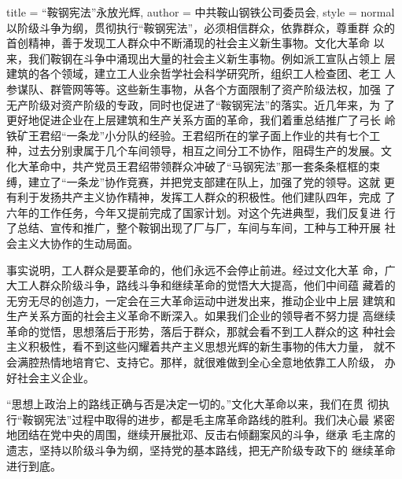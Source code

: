 \begin{hongqiarticle}{
        title  = {“鞍钢宪法”永放光辉},
        author = {中共鞍山钢铁公司委员会},
        style  = normal
    }
    以阶级斗争为纲，贯彻执行“鞍钢宪法”，必须相信群众，依靠群众，尊重群
    众的首创精神，善于发现工人群众中不断涌现的社会主义新生事物。文化大革命
    以来，我们鞍钢在斗争中涌现出大量的社会主义新生事物。例如派工宣队占领上
    层建筑的各个领域，建立工人业余哲学社会科学研究所，组织工人检查团、老工
    人参谋队、群管网等等。这些新生事物，从各个方面限制了资产阶级法权，加强
    了无产阶级对资产阶级的专政，同时也促进了“鞍钢宪法”的落实。近几年来，为
    了更好地促进企业在上层建筑和生产关系方面的革命，我们着重总结推广了弓长
    岭铁矿王君绍“一条龙”小分队的经验。王君绍所在的掌子面上作业的共有七个工
    种，过去分别隶属于几个车间领导，相互之间分工不协作，阻碍生产的发展。文
    化大革命中，共产党员王君绍带领群众冲破了“马钢宪法”那一套条条框框的束
    缚，建立了“一条龙”协作竞赛，并把党支部建在队上，加强了党的领导。这就
    更有利于发扬共产主义协作精神，发挥工人群众的积极性。他们建队四年，完成
    了六年的工作任务，今年又提前完成了国家计划。对这个先进典型，我们反复进
    行了总结、宣传和推广，整个鞍钢出现了厂与厂，车间与车间，工种与工种开展
    社会主义大协作的生动局面。

    事实说明，工人群众是要革命的，他们永远不会停止前进。经过文化大革
    命，广大工人群众阶级斗争，路线斗争和继续革命的觉悟大大提高，他们中间蕴
    藏着的无穷无尽的创造力，一定会在三大革命运动中迸发出来，推动企业中上层
    建筑和生产关系方面的社会主义革命不断深入。如果我们企业的领导者不努力提
    高继续革命的觉悟，思想落后于形势，落后于群众，那就会看不到工人群众的这
    种社会主义积极性，看不到这些闪耀着共产主义思想光辉的新生事物的伟大力量，
    就不会满腔热情地培育它、支持它。那样，就很难做到全心全意地依靠工人阶级，
    办好社会主义企业。

    “思想上政治上的路线正确与否是决定一切的。”文化大革命以来，我们在贯
    彻执行“鞍钢宪法”过程中取得的进步，都是毛主席革命路线的胜利。我们决心最
    紧密地团结在党中央的周围，继续开展批邓、反击右倾翻案风的斗争，继承
    毛主席的遗志，坚持以阶级斗争为纲，坚持党的基本路线，把无产阶级专政下的
    继续革命进行到底。
\end{hongqiarticle}
